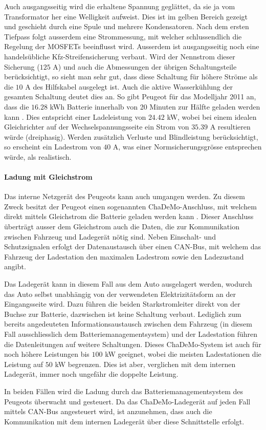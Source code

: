 Auch ausgangsseitig wird die erhaltene Spannung geglättet, da sie ja vom Transformator her eine Welligkeit aufweist. Dies ist im gelben Bereich gezeigt und geschieht durch eine Spule und mehrere Kondensatoren. Nach dem ersten Tiefpass folgt ausserdem eine Strommessung, mit welcher schlussendlich die Regelung der MOSFETs beeinflusst wird. Ausserdem ist ausgangsseitig noch eine handelsübliche Kfz-Streifensicherung verbaut. Wird der Nennstrom dieser Sicherung ($125$ A) und auch die Abmessungen der übrigen Schaltungsteile berücksichtigt, so sieht man sehr gut, dass diese Schaltung für höhere Ströme als die $10$ A des Hilfskabel ausgelegt ist. Auch die aktive Wasserkühlung der gesamten Schaltung deutet dies an. So gibt Peugeot für das Modelljahr 2011 an, dass die $16.28$ kWh Batterie innerhalb von 20 Minuten zur Hälfte geladen werden kann \cite{ion}. Dies entspricht einer Ladeleistung von $24.42$ kW, wobei bei einem idealen Gleichrichter auf der Wechselspannungsseite ein Strom von $35.39$ A resultieren würde (dreiphasig). Werden zusätzlich Verluste und Blindleistung berücksichtigt, so erscheint ein Ladestrom von $40$ A, was einer Normsicherungsgrösse entsprechen würde, als realistisch.

\paragraph{Ladung mit Gleichstrom}
Das interne Netzgerät des Peugeots kann auch umgangen werden. Zu diesem Zweck besitzt der Peugeot einen sogenannten ChaDeMo-Anschluss, mit welchem direkt mittels Gleichstrom die Batterie geladen werden kann \cite{chademo}. Dieser Anschluss überträgt ausser dem Gleichstrom auch die Daten, die zur Kommunikation zwischen Fahrzeug und Ladegerät nötig sind. Neben Einschalt- und Schutzsignalen erfolgt der Datenaustausch über einen CAN-Bus, mit welchem das Fahrzeug der Ladestation den maximalen Ladestrom sowie den Ladezustand angibt.

Das Ladegerät kann in diesem Fall aus dem Auto ausgelagert werden, wodurch das Auto selbst unabhängig von der verwendeten Elektrizitätsform an der Eingangsseite wird. Dazu führen die beiden Starkstromleiter direkt von der Buchse zur Batterie, dazwischen ist keine Schaltung verbaut. Lediglich zum bereits angedeuteten Informationsaustausch zwischen dem Fahrzeug (in diesem Fall ausschliesslich dem Batteriemanagementsystem) und der Ladestation führen die Datenleitungen auf weitere Schaltungen. Dieses ChaDeMo-System ist auch für noch höhere Leistungen bis $100$ kW geeignet, wobei die meisten Ladestationen die Leistung auf $50$ kW begrenzen. Dies ist aber, verglichen mit dem internen Ladegerät, immer noch ungefähr die doppelte Leistung.

In beiden Fällen wird die Ladung durch das Batteriemanagementsystem des Peugeots überwacht und gesteuert. Da das ChaDeMo-Ladegerät auf jeden Fall mittels CAN-Bus angesteuert wird, ist anzunehmen, dass auch die Kommunikation mit dem internen Ladegerät über diese Schnittstelle erfolgt.
